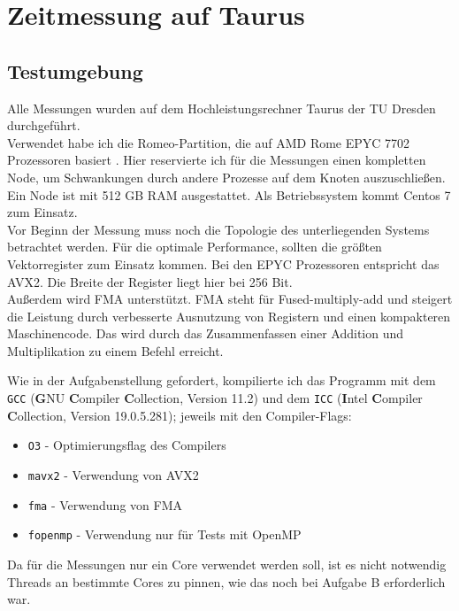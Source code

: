 \documentclass[german,plainarticle,hyperref,utf8]{zihpub}
\begin{document}
	\section{Zeitmessung auf Taurus}
	\subsection{Testumgebung} \label{umgebung}
	Alle Messungen wurden auf dem Hochleistungsrechner Taurus der TU Dresden durchgeführt.\\
	Verwendet habe ich die Romeo-Partition, die auf AMD Rome EPYC 7702 Prozessoren basiert \cite{hpc}. Hier reservierte ich für die Messungen einen kompletten Node, um Schwankungen durch andere Prozesse auf dem Knoten auszuschließen. Ein Node ist mit 512 GB RAM ausgestattet. Als Betriebssystem kommt Centos 7 zum Einsatz.\\
	
	Vor Beginn der Messung muss noch die Topologie des unterliegenden Systems betrachtet werden. Für die optimale Performance, sollten die größten Vektorregister zum Einsatz kommen. Bei den EPYC Prozessoren entspricht das AVX2. Die Breite der Register liegt hier bei 256 Bit.\\
	Außerdem wird FMA unterstützt. FMA steht für Fused-multiply-add und steigert die Leistung durch verbesserte Ausnutzung von Registern und einen kompakteren Maschinencode. Das wird durch das Zusammenfassen einer Addition und Multiplikation zu einem Befehl erreicht.
	
	Wie in der Aufgabenstellung gefordert, kompilierte ich das Programm mit dem \texttt{GCC} (\textbf{G}NU \textbf{C}ompiler \textbf{C}ollection, Version 11.2) und dem \texttt{ICC} (\textbf{I}ntel \textbf{C}ompiler \textbf{C}ollection, Version 19.0.5.281); jeweils mit den Compiler-Flags:
	\begin{itemize}
		\item \texttt{O3} - Optimierungsflag des Compilers
		\item \texttt{mavx2} - Verwendung von AVX2
		\item \texttt{fma} - Verwendung von FMA
		\item \texttt{fopenmp} - Verwendung nur für Tests mit OpenMP
	\end{itemize}
	
	Da für die Messungen nur ein Core verwendet werden soll, ist es nicht notwendig Threads an bestimmte Cores zu pinnen, wie das noch bei Aufgabe B erforderlich war.\\
	
\end{document}
